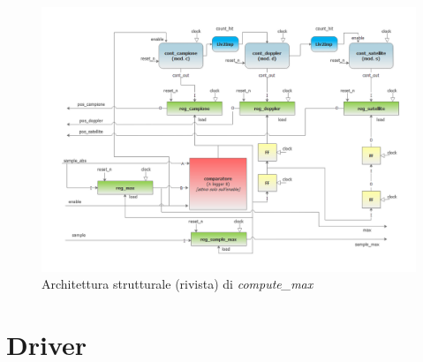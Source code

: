 \documentclass[12pt,a4paper,twoside,openany]{book}
\begin{document}
\begin{figure}
\includegraphics[scale=0.55, keepaspectratio]{immagini/computemax_schemablocchi2}
\caption{Architettura strutturale (rivista) di \textit{compute\_max}}
\label{computemax_schema}
\end{figure}

\chapter{Driver}
\end{document}
